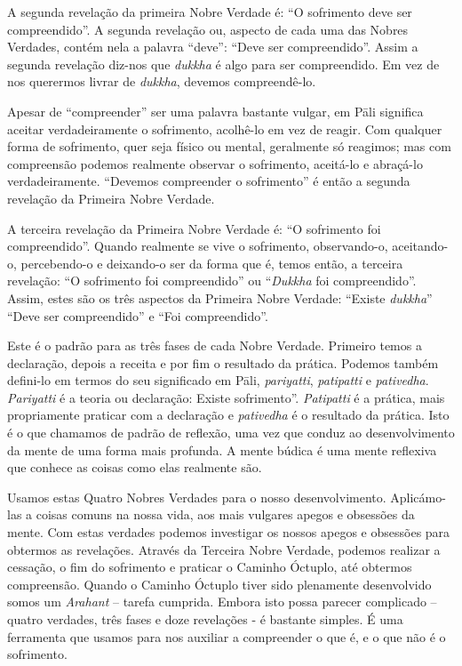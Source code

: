 A segunda revelação da primeira Nobre Verdade é: “O sofrimento deve ser
compreendido”. A segunda revelação ou, aspecto de cada uma das Nobres Verdades,
contém nela a palavra “deve”: “Deve ser compreendido”. Assim a segunda revelação
diz-nos que \emph{dukkha} é algo para ser compreendido. Em vez de nos querermos livrar
de \emph{dukkha}, devemos compreendê-lo.

Apesar de “compreender” ser uma palavra bastante vulgar, em Pāli significa
aceitar verdadeiramente o sofrimento, acolhê-lo em vez de reagir. Com qualquer
forma de sofrimento, quer seja físico ou mental, geralmente só reagimos; mas com
compreensão podemos realmente observar o sofrimento, aceitá-lo e abraçá-lo
verdadeiramente. “Devemos compreender o sofrimento” é então a segunda revelação
da Primeira Nobre Verdade.

A terceira revelação da Primeira Nobre Verdade é: “O sofrimento foi
compreendido”. Quando realmente se vive o sofrimento, observando-o, aceitando-o,
percebendo-o e deixando-o ser da forma que é, temos então, a terceira revelação:
“O sofrimento foi compreendido” ou “\emph{Dukkha} foi compreendido”. Assim,
estes são os três aspectos da Primeira Nobre Verdade: “Existe \emph{dukkha}”
“Deve ser compreendido” e “Foi compreendido”.

\sectionBreak

Este é o padrão para as três fases de cada Nobre Verdade. Primeiro temos a
declaração, depois a receita e por fim o resultado da prática. Podemos também
defini-lo em termos do seu significado em Pāli, \emph{pariyatti},
\emph{patipatti} e \emph{pativedha}. \emph{Pariyatti} é a teoria ou declaração:
Existe sofrimento”. \emph{Patipatti} é a prática, mais propriamente praticar com
a declaração e \emph{pativedha} é o resultado da prática. Isto é o que chamamos
de padrão de reflexão, uma vez que conduz ao desenvolvimento da mente de uma
forma mais profunda. A mente búdica é uma mente reflexiva que conhece as coisas
como elas realmente são.

Usamos estas Quatro Nobres Verdades para o nosso desenvolvimento. Aplicámo-las a
coisas comuns na nossa vida, aos mais vulgares apegos e obsessões da mente. Com
estas verdades podemos investigar os nossos apegos e obsessões para obtermos as
revelações. Através da Terceira Nobre Verdade, podemos realizar a cessação, o
fim do sofrimento e praticar o Caminho Óctuplo, até obtermos compreensão.
Quando o Caminho Óctuplo tiver sido plenamente desenvolvido somos um
\emph{Arahant} – tarefa cumprida. Embora isto possa parecer complicado – quatro
verdades, três fases e doze revelações - é bastante simples. É uma ferramenta
que usamos para nos auxiliar a compreender o que é, e o que não é o sofrimento.

